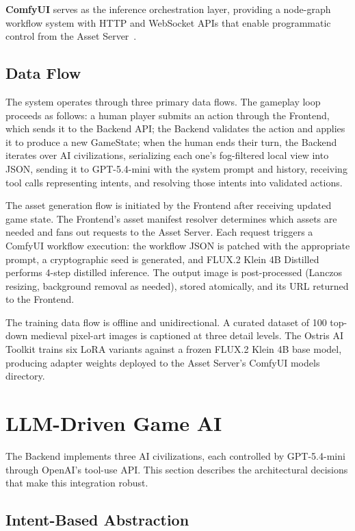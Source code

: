 \documentclass[conference]{IEEEtran}
\begin{document}
\textbf{ComfyUI} serves as the inference orchestration layer, providing a
node-graph workflow system with HTTP and WebSocket APIs that enable
programmatic control from the Asset Server~\cite{comfyui2023}.

\subsection{Data Flow}

The system operates through three primary data flows. The gameplay loop
proceeds as follows: a human player submits an action through the Frontend,
which sends it to the Backend API; the Backend validates the action and
applies it to produce a new GameState; when the human ends their turn, the
Backend iterates over AI civilizations, serializing each one's fog-filtered
local view into JSON, sending it to GPT-5.4-mini with the system prompt and
history, receiving tool calls representing intents, and resolving those
intents into validated actions.

The asset generation flow is initiated by the Frontend after receiving
updated game state. The Frontend's asset manifest resolver determines which
assets are needed and fans out requests to the Asset Server. Each request
triggers a ComfyUI workflow execution: the workflow JSON is patched with
the appropriate prompt, a cryptographic seed is generated, and FLUX.2
Klein 4B Distilled performs 4-step distilled inference. The output image is
post-processed (Lanczos resizing, background removal as needed), stored
atomically, and its URL returned to the Frontend.

The training data flow is offline and unidirectional. A curated dataset of
100 top-down medieval pixel-art images is captioned at three detail levels.
The Ostris AI Toolkit trains six LoRA variants against a frozen FLUX.2
Klein 4B base model, producing adapter weights deployed to the Asset
Server's ComfyUI models directory.

\FloatBarrier
\section{LLM-Driven Game AI}
\label{sec:llm}

The Backend implements three AI civilizations, each controlled by
GPT-5.4-mini through OpenAI's tool-use API. This section describes the
architectural decisions that make this integration robust.

\subsection{Intent-Based Abstraction}
\end{document}
